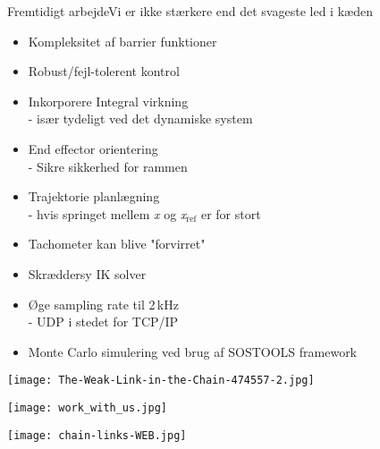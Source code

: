 \begin{frame}{Fremtidigt arbejde}{Vi er ikke stærkere end det svageste led i kæden}
\begin{minipage}{0.65\textwidth}
\begin{block}{}
	\begin{itemize}
		\item \normalsize Kompleksitet af barrier funktioner
		\item \normalsize Robust/fejl-tolerent kontrol %
		\item \normalsize Inkorporere Integral virkning \\ 
		\scriptsize {\color{white}{m}} - især tydeligt ved det dynamiske system
		\item \normalsize End effector orientering \\
		\scriptsize {\color{white}{m}} -  Sikre sikkerhed for rammen
		\item \normalsize  Trajektorie planlægning \\ 
		\scriptsize {\color{white}{m}} - hvis springet mellem \textit{x} og \textit{x}$_{\text{ref}}$ er for stort
		\item \normalsize Tachometer kan blive "forvirret"
		\item Skræddersy IK solver
		\item Øge sampling rate til 2\,kHz \\
		\scriptsize {\color{white}{m}} - UDP i stedet for TCP/IP
		\item \normalsize  Monte Carlo simulering ved brug af SOSTOOLS framework
	\end{itemize}
\end{block}
\end{minipage}
\begin{minipage}{0.3\textwidth}
\texttt{[image: The-Weak-Link-in-the-Chain-474557-2.jpg]}
\vspace*{0.2cm}

\texttt{[image: work\_with\_us.jpg]}
\vspace*{0.2cm}

\texttt{[image: chain-links-WEB.jpg]}
\end{minipage}
\end{frame}